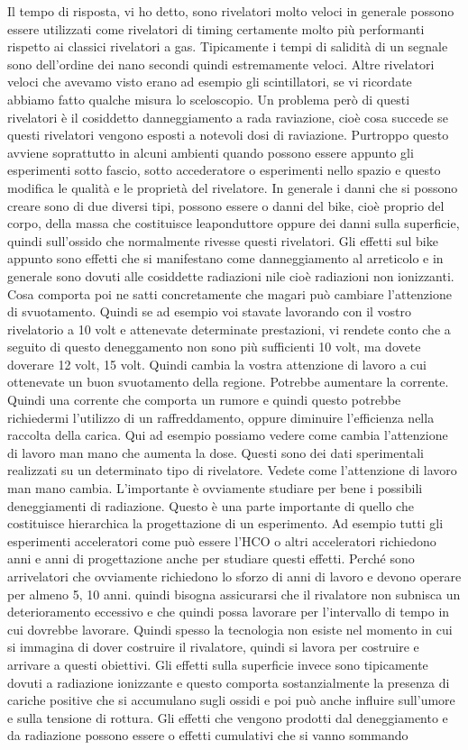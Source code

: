 Il tempo di risposta, vi ho detto, sono rivelatori molto veloci in generale possono essere utilizzati come rivelatori di timing certamente molto più performanti rispetto ai classici rivelatori a gas. Tipicamente i tempi di salidità di un segnale sono dell'ordine dei nano secondi quindi estremamente veloci. Altre rivelatori veloci che avevamo visto erano ad esempio gli scintillatori, se vi ricordate abbiamo fatto qualche misura lo sceloscopio. Un problema però di questi rivelatori è il cosiddetto danneggiamento a rada raviazione, cioè cosa succede se questi rivelatori vengono esposti a notevoli dosi di raviazione. Purtroppo questo avviene soprattutto in alcuni ambienti quando possono essere appunto gli esperimenti sotto fascio, sotto accederatore o esperimenti nello spazio e questo modifica le qualità e le proprietà del rivelatore. In generale i danni che si possono creare sono di due diversi tipi, possono essere o danni del bike, cioè proprio del corpo, della massa che costituisce leaponduttore oppure dei danni sulla superficie, quindi sull'ossido che normalmente rivesse questi rivelatori. Gli effetti sul bike appunto sono effetti che si manifestano come danneggiamento al arreticolo e in generale sono dovuti alle cosiddette radiazioni nile cioè radiazioni non ionizzanti. Cosa comporta poi ne satti concretamente che magari può cambiare l'attenzione di svuotamento. Quindi se ad esempio voi stavate lavorando con il vostro rivelatorio a 10 volt e attenevate determinate prestazioni, vi rendete conto che a seguito di questo deneggamento non sono più sufficienti 10 volt, ma dovete doverare 12 volt, 15 volt. Quindi cambia la vostra attenzione di lavoro a cui ottenevate un buon svuotamento della regione. Potrebbe aumentare la corrente. Quindi una corrente che comporta un rumore e quindi questo potrebbe richiedermi l'utilizzo di un raffreddamento, oppure diminuire l'efficienza nella raccolta della carica. Qui ad esempio possiamo vedere come cambia l'attenzione di lavoro man mano che aumenta la dose. Questi sono dei dati sperimentali realizzati su un determinato tipo di rivelatore. Vedete come l'attenzione di lavoro man mano cambia. L'importante è ovviamente studiare per bene i possibili deneggiamenti di radiazione. Questo è una parte importante di quello che costituisce hierarchica la progettazione di un esperimento. Ad esempio tutti gli esperimenti acceleratori come può essere l'HCO o altri acceleratori richiedono anni e anni di progettazione anche per studiare questi effetti. Perché sono arrivelatori che ovviamente richiedono lo sforzo di anni di lavoro e devono operare per almeno 5, 10 anni. quindi bisogna assicurarsi che il rivalatore non subnisca un deterioramento eccessivo e che quindi possa lavorare per l'intervallo di tempo in cui dovrebbe lavorare. Quindi spesso la tecnologia non esiste nel momento in cui si immagina di dover costruire il rivalatore, quindi si lavora per costruire e arrivare a questi obiettivi. Gli effetti sulla superficie invece sono tipicamente dovuti a radiazione ionizzante e questo comporta sostanzialmente la presenza di cariche positive che si accumulano sugli ossidi e poi può anche influire sull'umore e sulla tensione di rottura. Gli effetti che vengono prodotti dal deneggiamento e da radiazione possono essere o effetti cumulativi che si vanno sommando 